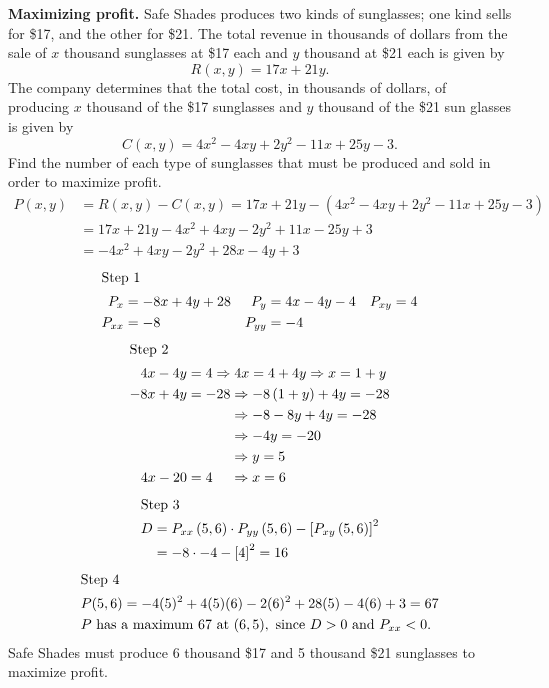 \documentclass[12pt]{article}
\newenvironment{problem}[2][]{
    \begin{trivlist}
        \item[
            {\bfseries #1}
            {\bfseries #2.}
        ]
}{\end{trivlist}}
\begin{document}
\begin{problem}{15}
    \textbf{Maximizing profit.}
    Safe Shades produces two kinds of sunglasses; one kind sells for \$17, and the other for \$21.
    The total revenue in thousands of dollars from the sale of $x$ thousand sunglasses at \$17 each and $y$ thousand at \$21 each is given by $$R(x,y) = 17x + 21y.$$
    The company determines that the total cost, in thousands of dollars, of producing $x$ thousand of the \$17 sunglasses and $y$ thousand of the \$21 sun glasses is given by $$C(x,y) = 4x^2 - 4xy + 2y^2 - 11x + 25y - 3.$$
    Find the number of each type of sunglasses that must be produced and sold in order to maximize profit.
    \begin{align}
        P(x, y) &= R(x,y) - C(x,y) = 17x + 21y - \left(4x^2 - 4xy + 2y^2 - 11x + 25y - 3\right) \\
        &= 17x + 21y - 4x^2 + 4xy - 2y^2 + 11x - 25y + 3 \\
        &= -4x^2 + 4xy - 2y^2 + 28x - 4y + 3
    \end{align}
    \begin{align*}
        \shortintertext{Step 1}
        P_x &= -8x + 4y + 28 & P_y &= 4x - 4y - 4 & P_{xy} &= 4 \\
        P_{xx} &= -8 & P_{yy} &= -4
    \end{align*}
    \begin{align}
        \shortintertext{Step 2}
        4x - 4y &= 4 \Rightarrow 4x = 4 + 4y \Rightarrow x = 1 + y \\
        -8x + 4y &= -28 \Rightarrow -8 \left(1 + y\right) + 4y = -28 \\
        &\phantom{=: -28} \Rightarrow -8 - 8y + 4y = -28 \\
        &\phantom{=: -28} \Rightarrow -4y = -20 \\
        &\phantom{=: -28} \Rightarrow y = 5 \\
        4x - 20 &= 4 \phantom{.28} \Rightarrow x = 6
    \end{align}
    \begin{align}
        \shortintertext{Step 3}
        D &= P_{xx} \left(5, 6\right) \cdot P_{yy} \left(5, 6\right) - \left[P_{xy} \left(5, 6\right)\right]^2 \\
        &= -8 \cdot -4 - \left[4\right]^2 = 16
    \end{align}
    \begin{align}
        \shortintertext{Step 4}
        &P (5,6) = -4(5)^2 + 4(5)(6) - 2(6)^2 + 28(5) - 4(6) + 3 = 67 \\
        &P \text{ has a maximum } 67 \text{ at } (6, 5), \text{ since } D > 0 \text{ and } P_{xx} < 0. 
    \end{align}
        Safe Shades must produce 6 thousand \$17 and 5 thousand \$21 sunglasses to maximize profit.
\end{problem}
\end{document}
